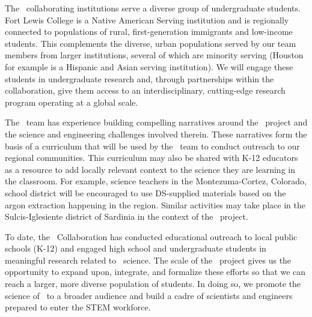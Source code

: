 The \DS\ collaborating institutions serve a diverse group of undergraduate students. Fort Lewis College is a Native American Serving institution and is regionally connected to populations of rural, first-generation immigrants and low-income students. This complements the diverse, urban populations served by our team members from larger institutions, several of which are minority serving (Houston for example is a Hispanic and Asian serving institution). We will engage these students in undergraduate research and, through partnerships within the collaboration, give them access to an interdisciplinary, cutting-edge research program operating at a global scale.

The \DS\ team has experience building compelling narratives around the \DS\ project and the science and engineering challenges involved therein.  These narratives form the basis of a curriculum that will be used by the \DS\ team to conduct outreach to our regional communities. This curriculum may also be shared with K-12 educators as a resource to add locally relevant context to the science they are learning in the classroom.  For example, science teachers in the Montezuma-Cortez, Colorado, school district will be encouraged to use DS-supplied materials based on the argon extraction happening in the region.  Similar activities may take place in the Sulcis-Iglesiente district of Sardinia in the context of the \Aria\ project. 

To date, the \GADMC\ Collaboration has conducted educational outreach to local public schools (K-12) and engaged high school and undergraduate students in meaningful research related to \DS\ science.  The scale of the \DSks\ project gives us the opportunity to expand upon, integrate, and formalize these efforts so that we can reach a larger, more diverse population of students.  In doing so, we promote the science of \DS\ to a broader audience and build a cadre of scientists and engineers prepared to enter the STEM workforce.
